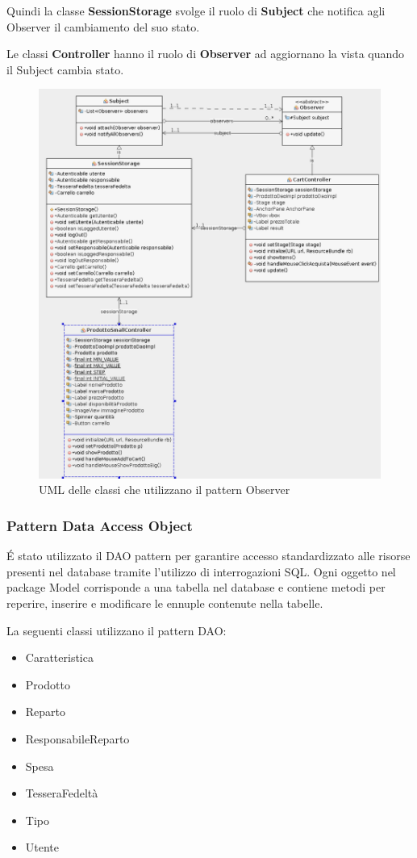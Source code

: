\documentclass{article}
\begin{document}
\noindent Quindi la classe \textbf{SessionStorage} svolge il ruolo di \textbf{Subject} che notifica agli
Observer il cambiamento del suo stato.


\noindent Le classi \textbf{Controller} hanno il ruolo di \textbf{Observer} ad aggiornano la vista quando
il Subject cambia stato.

\begin{figure}[h!]
	\centering
	\includegraphics[width=\textwidth]{UmlObserver.png}
	\caption{UML delle classi che utilizzano il pattern Observer}
	\label{fig:UmlObserver}
\end{figure}
\clearpage
\newpage
\subsubsection{Pattern Data Access Object}
\'E stato utilizzato il DAO pattern per garantire accesso standardizzato alle risorse presenti nel database
tramite l'utilizzo di interrogazioni SQL.
Ogni oggetto nel package Model corrisponde a una tabella nel database e contiene metodi per reperire, inserire
e modificare le ennuple contenute nella tabelle.


\noindent La seguenti classi utilizzano il pattern DAO:
\begin{itemize}
	\item Caratteristica
	\item Prodotto
	\item Reparto
	\item ResponsabileReparto
	\item Spesa
	\item TesseraFedeltà
	\item Tipo
	\item Utente
\end{itemize}
\end{document}
